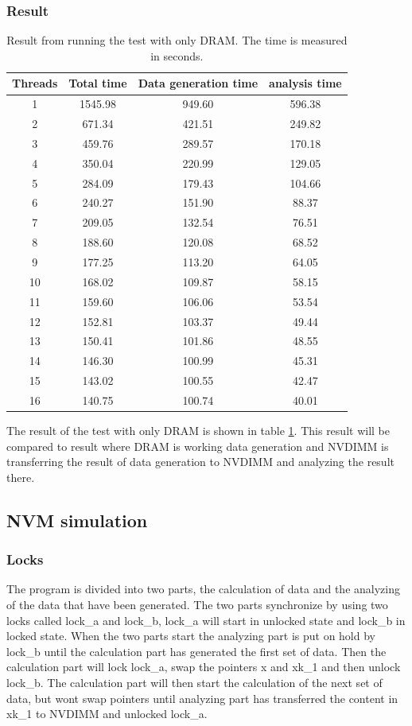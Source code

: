 \documentclass[12pt,a4paper,USenglish]{article}      %
\begin{document}
\subsubsection{Result}
\begin{table}[!hbtp]
\centering
\begin{tabular}{ |c|c|c|c| } 
\hline
Threads &  Total time & Data generation time &  analysis time \\
\hline
1 & 1545.98 & 949.60 & 596.38 \\
\hline
2 & 671.34 & 421.51 & 249.82 \\
\hline
3 & 459.76 & 289.57 & 170.18 \\
\hline
4 & 350.04 & 220.99 & 129.05 \\
\hline
5 & 284.09 & 179.43 & 104.66 \\
\hline
6 & 240.27 & 151.90 & 88.37 \\
\hline
7 & 209.05 & 132.54 & 76.51 \\
\hline
8 & 188.60 & 120.08 & 68.52 \\
\hline
9 & 177.25 & 113.20 & 64.05 \\
\hline
10 & 168.02 & 109.87 & 58.15 \\
\hline
11 & 159.60 & 106.06 & 53.54 \\
\hline
12 & 152.81 & 103.37 & 49.44 \\
\hline
13 & 150.41 & 101.86 & 48.55 \\
\hline
14 & 146.30 & 100.99 & 45.31 \\
\hline
15 & 143.02 & 100.55 & 42.47 \\
\hline
16 & 140.75 & 100.74 & 40.01 \\
\hline
\end{tabular}
\caption{Result from running the test with only DRAM. The time is measured in seconds.}
\label{tab:DramOnlyResult}
\end{table}

The result of the test with only DRAM is shown in table \ref{tab:DramOnlyResult}. This result will be compared to result where DRAM is working data generation and NVDIMM is transferring the result of data generation to NVDIMM and analyzing the result there.

\pagebreak
\subsection{NVM simulation}
\subsubsection{Locks}
The program is divided into two parts, the calculation of data and the analyzing of the data that have been generated. The two parts synchronize by using two locks called lock\_a and lock\_b, lock\_a will start in unlocked state and lock\_b in locked state. When the two parts start the analyzing part is put on hold by lock\_b until the calculation part has generated the first set of data. Then the calculation part will lock lock\_a, swap the pointers x and xk\_1 and then unlock lock\_b. The calculation part will then start the calculation of the next set of data, but wont swap pointers until analyzing part has transferred the content in xk\_1 to NVDIMM and unlocked lock\_a.
\end{document}
